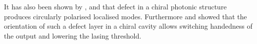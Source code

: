 It has also been shown by \textcite{kopp_twist_2002}, \textcite{hodgkinson_supermodes_2003} and \textcite{oldano_comment_2004} that defect in a chiral photonic structure produces circularly polarised localised modes. Furthermore \textcite{harutyunyan_optical_2007} and \textcite{belyakova_optical_2011} showed that the orientation of such a defect layer in a chiral cavity allows switching handedness of the output and lowering the lasing threshold.
